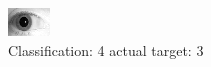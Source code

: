 \begin{figure}[h!]
\begin{center}
\includegraphics[width=0.60\columnwidth]{figures/ID1969_class_4_target_3.png}
\end{center}
\caption{ Classification: 4 actual target: 3}
\label{fig:ID1969_class_4_target_3}
\end{figure}
